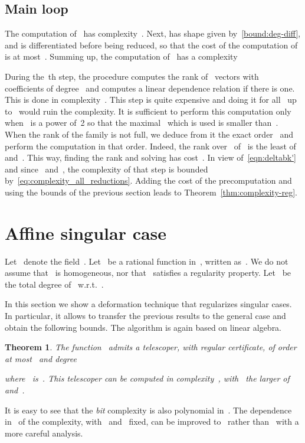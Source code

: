 \documentclass{sig-alternate}
\newtheorem{thm}{Theorem}
\begin{document}
\subsection{Main loop}

\noindent The computation of~ has complexity~.
Next,  has shape given by~\eqref{bound:deg-diff}, and is differentiated before being reduced, so that the cost of 
the computation of~ is at most~.
Summing up, the computation of~ has a complexity


During the~th step, the procedure computes the rank of~ vectors with~ coefficients of degree~ and computes a linear dependence relation if there is one.
This is done in complexity~.
This step is quite expensive and doing it for all~ up to~ would ruin the complexity.
It is sufficient to perform this computation only when~ is a  power of~2 so that the maximal~ which is used is smaller than~.
When the rank of the family is not full, we deduce from it the exact order~ and perform the computation in that order.
Indeed, the rank over~ of~ is the least of~ and~.
This way, finding the rank and solving has cost~. In view of~\eqref{eqn:deltabk'} and since~ and~, the complexity of that step is bounded by~\eqref{eq:complexity_all_reductions}.
Adding the cost of the precomputation and using the bounds of the previous section leads to Theorem~\ref{thm:complexity-reg}.

\section{Affine singular case}
\label{sec:singular}


\noindent Let~ denote the field~.
Let~ be a rational function in~, written as~.
We do not assume that~ is homogeneous, nor that~ satisfies a regularity property.
Let~ be the total degree of~ w.r.t.~.

In this section we show a deformation technique that regularizes singular cases.
In particular, it allows to transfer the previous results to the general case and obtain the following bounds.
The algorithm is again based on linear algebra.

\begin{thm}\label{thm:bound-affine}
  The function~ admits a telescoper, with regular certificate, of order at most~ and degree
  
  where~ is~.
  This telescoper can be computed in complexity~, with~ the larger of~ and~.
\end{thm}
 It is easy to see that the \emph{bit} complexity is also polynomial in~.
The dependence in~ of the complexity, with~ and~ fixed, can be improved to~ rather than~ with a more careful analysis.
\end{document}
